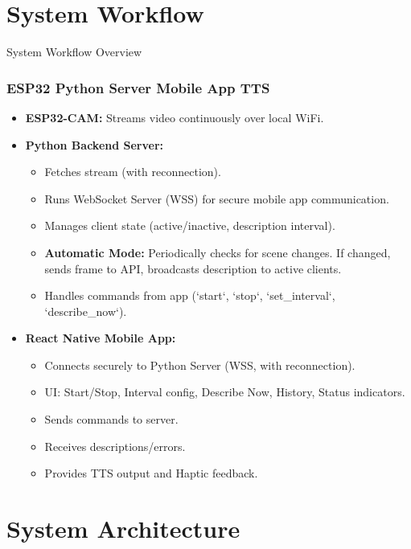 \documentclass{beamer}
\begin{document}
\section{System Workflow}

\begin{frame}{System Workflow Overview}
  \frametitle{ESP32 \textrightarrow Python Server \textrightarrow Mobile App \textrightarrow TTS}
    \begin{itemize}
        \item \textbf{ESP32-CAM:} Streams video continuously over local WiFi.
        \item \textbf{Python Backend Server:}
            \begin{itemize}
                \item Fetches stream (with reconnection).
                \item Runs WebSocket Server (WSS) for secure mobile app communication.
                \item Manages client state (active/inactive, description interval).
                \item \textbf{Automatic Mode:} Periodically checks for scene changes. If changed, sends frame to API, broadcasts description to active clients.
                \item Handles commands from app (`start`, `stop`, `set\_interval`, `describe\_now`).
            \end{itemize}
         \item \textbf{React Native Mobile App:}
            \begin{itemize}
                \item Connects securely to Python Server (WSS, with reconnection).
                \item UI: Start/Stop, Interval config, Describe Now, History, Status indicators.
                \item Sends commands to server.
                \item Receives descriptions/errors.
                \item Provides TTS output and Haptic feedback.
            \end{itemize}
    \end{itemize}
\end{frame}

\section{System Architecture}
\end{document}
